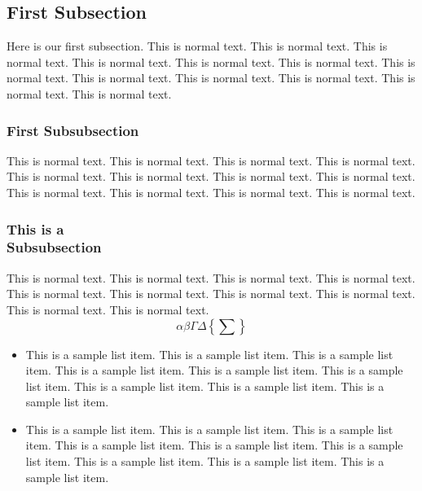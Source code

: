 \subsection{First Subsection}
Here is our first subsection.
This is normal text. This is normal text. This is normal text.
This is normal text. This is normal text. This is normal text.
This is normal text. This is normal text. This is normal text.
This is normal text. This is normal text. This is normal text.


\subsubsection{First Subsubsection}
This is normal text.  This is normal text. This is normal text.
This is normal text. This is normal text. This is normal text.
This is normal text. This is normal text. This is normal text.
This is normal text. This is normal text. This is normal text.



\subsubsection{This is a\\ Subsubsection}
This is normal text. This is normal text. This is normal text. 
This is normal text. This is normal text. This is normal text.
This is normal text. This is normal text. This is normal text. 
This is normal text.
\begin{equation}
\alpha\beta\Gamma\Delta\left\{\sum\right\}
\end{equation}



\begin{itemize}
\item
This is a sample list item. This is a sample list item.
This is a sample list item. This is a sample list item.
This is a sample list item. This is a sample list item.
This is a sample list item. This is a sample list item.
This is a sample list item.

\item
This is a sample list item. This is a sample list item.
This is a sample list item. This is a sample list item.
This is a sample list item. This is a sample list item.
This is a sample list item. This is a sample list item.
This is a sample list item.
\end{itemize}

